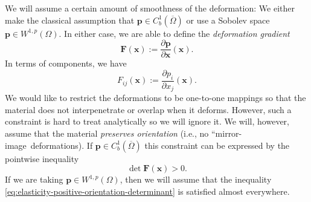We will assume a certain amount of smoothness of the deformation: We either make the classical assumption that $\bm{p}\in C_b^1(\overline\Omega)$ or use a Sobolev space $\bm{p}\in W^{1,p}(\Omega)$. In either case, we are able to define the \emph{deformation gradient}
\begin{equation}\label{eq:elasticity-deformation-gradient}
\bm{F}(\bm{x}):=\dfrac{\partial\bm{p}}{\partial\bm{x}}(\bm{x}).
\end{equation}
In terms of components, we have
\begin{equation}\label{eq:elasticity-deformation-gradient-components}
F_{ij}(\bm{x}):=\dfrac{\partial p_i}{\partial x_j}(\bm{x}).
\end{equation}
We would like to restrict the deformations to be one-to-one mappings so that the material does not interpenetrate or overlap when it deforms. However, such a constraint is hard to treat analytically so we will ignore it. We will, however, assume that the material \emph{preserves orientation} (i.e., no ``mirror-image\textquotesingle\textquotesingle\ deformations). If $\bm{p}\in C_b^1(\overline\Omega)$ this constraint can be expressed by the pointwise inequality
\begin{equation}\label{eq:elasticity-positive-orientation-determinant}
\det\bm{F}(\bm{x})>0.
\end{equation}
If we are taking $\bm{p}\in W^{1,p}(\Omega)$, then we will assume that the inequality \eqref{eq:elasticity-positive-orientation-determinant} is satisfied almost everywhere.


